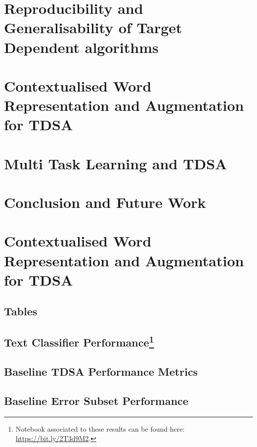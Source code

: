 \documentclass[11pt]{report}
\begin{document}
\chapter{Reproducibility and Generalisability of Target Dependent algorithms}
\label{chapter:reproducibility}

\chapter{Contextualised Word Representation and Augmentation for TDSA}

\chapter{Multi Task Learning and TDSA}
\chapter{Conclusion and Future Work}
\appendix
\chapter{Contextualised Word Representation and Augmentation for TDSA}
\section{Tables}

\section{Text Classifier Performance\footnote{Notebook associated to these results can be found here: \url{https://bit.ly/2T3d9M2}.}}
\label{section:appendix_cnn_tdsa_baseline}

\section{Baseline TDSA Performance Metrics}
\label{section:appendix_tdsa_baseline_metrics}

\section{Baseline Error Subset Performance}
\label{section:appendix_baseline_error_subset_performance}




\printbibliography
\end{document}
